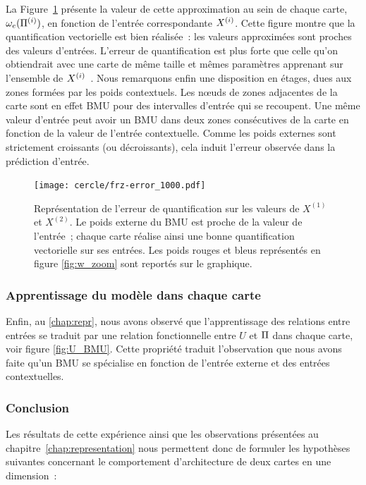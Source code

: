 \documentclass[../main]{subfiles}
\begin{document}
La Figure~\ref{fig:qv} présente la valeur de cette approximation au sein de chaque carte, $\omega_{e}(\Pi^{({i})})$, en fonction de l'entrée correspondante $X^{({i})}$. 
Cette figure montre que la quantification vectorielle est bien réalisée~: les valeurs approximées sont proches des valeurs d'entrées.
L'erreur de quantification est plus forte que celle qu'on obtiendrait avec une carte de même taille et mêmes paramètres apprenant sur l'ensemble de $X^{({i})}$~. 
Nous remarquons enfin une disposition en étages, dues aux zones formées par les poids contextuels.
Les n\oe{}uds de zones adjacentes de la carte sont en effet BMU pour des intervalles d'entrée qui se recoupent.
Une même valeur d'entrée peut avoir un BMU dans deux zones consécutives de la carte en fonction de la valeur de l'entrée contextuelle. Comme les poids externes sont strictement croissants (ou décroissants), cela induit l'erreur observée dans la prédiction d'entrée.

\begin{figure}[h!]
	\centering\texttt{[image: cercle/frz-error\_1000.pdf]}
	\caption{Représentation de l'erreur de quantification sur les valeurs de $X^{(1)}$ et $X^{(2)}$. Le poids externe du BMU est proche de la valeur de l'entrée~; chaque carte réalise ainsi une bonne quantification vectorielle sur ses entrées. 
	Les poids rouges et bleus représentés en figure \ref{fig:w_zoom} sont reportés sur le graphique. \label{fig:qv}}
\end{figure}

\subsubsection{Apprentissage du modèle dans chaque carte}

Enfin, au \ref{chap:repr}, nous avons observé que l'apprentissage des relations entre entrées se traduit par une relation fonctionnelle entre $U$ et $\Pi$ dans chaque carte, voir figure \ref{fig:U_BMU}.
Cette propriété traduit l'observation que nous avons faite qu'un BMU se spécialise en fonction de l'entrée externe et des entrées contextuelles.

\subsubsection{Conclusion}

Les résultats de cette expérience ainsi que les observations présentées au chapitre~\ref{chap:representation} nous permettent donc de formuler les hypothèses suivantes concernant le comportement d'architecture de deux cartes en une dimension~:
\end{document}

